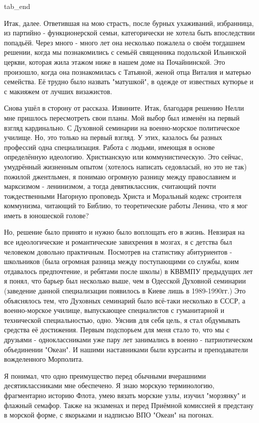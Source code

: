   tab_end
\fi

Итак, далее. Ответившая на мою страсть,
после бурных ухаживаний, избранница, из партийно - функционерской семьи,
категорически не хотела быть впоследствии попадьёй. Через много - много лет
она несколько пожалела о своём тогдашнем решении, когда мы познакомились с
семьёй священника подольской Ильинской церкви, которая жила этажом ниже в
нашем доме на Почайнинской. Это произошло, когда она познакомилась с
Татьяной, женой отца Виталия и матерью семейства. Её трудно было назвать
"матушкой", в одежде от известных кутюрье и с макияжем от лучших визажистов.

Снова ушёл в сторону от рассказа. Извините. Итак, благодаря решению Нелли мне
пришлось пересмотреть свои планы. Мой выбор был изменён на первый взгляд
кардинально. С Духовной семинарии на военно-морское политическое училище. Но,
это только на первый взгляд. У этих, казалось бы разных профессий одна
специализация. Работа с людьми, имеющая в основе определённую идеологию.
Христианскую или коммунистическую. Это сейчас, умудрённый жизненным опытом
(хотелось написать седовласый, но это не так) пожилой джентльмен, я понимаю
огромную разницу между православием и марксизмом - ленинизмом, а тогда
девятиклассник, считающий почти тождественными Нагорную проповедь Христа и
Моральный кодекс строителя коммунизма, читающий то Библию, то теоретические
работы Ленина, что я мог иметь в юношеской голове? 

Но, решение было принято и нужно было воплощать его в жизнь. Невзирая на все
идеологические и романтические завихрения в мозгах, я с детства был человеком
довольно практичным. Посмотрев на статистику абитуриентов - школьников (была
огромная разница между поступающими со службы, коим отдавалось предпочтение, и
ребятами  после школы) в КВВМПУ предыдущих лет я понял, что барьер был
несколько выше, чем в Одесской Духовной семинарии (заведение данной
специализации появилось в Киеве лишь в 1989-1990гг.) Это объяснялось тем, что
Духовных семинарий было всё-таки несколько в СССР, а военно-морское училище,
выпускающее специалистов с гуманитарной и технической специальностью, одно.
Уяснив для себя цель, я стал обдумывать средства её достижения. Первым
подспорьем для меня стало то, что мы с друзьями - одноклассниками уже пару лет
занимались в военно - патриотическом объединении "Океан". И нашими наставниками
были курсанты и преподаватели вожделенного Морполита. 

Я понимал, что одно преимущество перед обычными вчерашними десятиклассниками
мне обеспечено. Я знаю морскую терминологию, фрагментарно историю Флота, умею
вязать морские узлы, изучил "морзянку" и флажный семафор. Также на экзаменах и
перед Приёмной комиссией я предстану в морской форме, с якорьками и надписью
ВПО "Океан" на погонах. 

